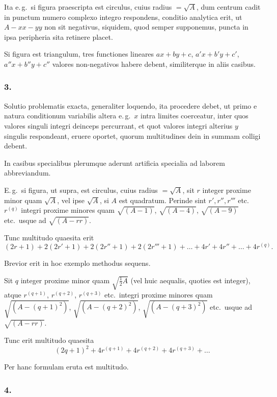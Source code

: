 \documentclass[12pt,a4paper]{article}
\begin{document}
Ita e.\,g.\ si figura praescripta est circulus, cuius radius $=\sqrt{A}$, dum centrum cadit in punctum numero complexo integro respondens, conditio analytica erit, ut $A-xx-yy$ non sit negativus, siquidem, quod semper supponemus, puncta in ipsa peripheria sita retinere placet.

Si figura est triangulum, tres functiones lineares $ax+by+c$, $a'x+b'y+c'$, $a''x+b''y+c''$ valores non-negativos habere debent, similiterque in aliis casibus.

\subsubsection*{3.}

Solutio problematis exacta, generaliter loquendo, ita procedere debet, ut primo e natura conditionum variabilis altera e.\,g.\ $x$ intra limites coerceatur, inter quos valores singuli integri deinceps percurrant, et quot valores integri alterius $y$ singulis respondeant, eruere oportet, quorum multitudines dein in summam colligi debent.

In casibus specialibus plerumque aderunt artificia specialia ad laborem abbreviandum.

E.\,g.\ si figura, ut supra, est circulus, cuius radius $=\sqrt{A}$, sit $r$ integer proxime minor quam $\sqrt{A}$, vel ipse $\sqrt{A}$, si $A$ est quadratum. Perinde sint $r', r'', r'''$ etc.\ $r^{(q)}$ integri proxime minores quam $\sqrt{(A-1)}$, $\sqrt{(A-4)}$, $\sqrt{(A-9)}$ etc.\ usque ad $\sqrt{(A-rr)}$.

Tunc multitudo quaesita erit
\[
(2r+1) + 2(2r'+1) + 2(2r''+1) + 2(2r'''+1) + \ldots + 4r' + 4r'' + \ldots + 4r^{(q)}.
\]

Brevior erit in hoc exemplo methodus sequens.

Sit $q$ integer proxime minor quam $\sqrt{\frac{1}{2}A}$ (vel huic aequalis, quoties est integer), atque $r^{(q+1)}$, $r^{(q+2)}$, $r^{(q+3)}$ etc.\ integri proxime minores quam $\sqrt{(A-(q+1)^2)}$, $\sqrt{(A-(q+2)^2)}$, $\sqrt{(A-(q+3)^2)}$ etc.\ usque ad $\sqrt{(A-rr)}$.

Tunc erit multitudo quaesita
\[
(2q+1)^2 + 4r^{(q+1)} + 4r^{(q+2)} + 4r^{(q+3)} + \ldots
\]

Per hanc formulam eruta est multitudo.

\subsubsection*{4.}
\end{document}
